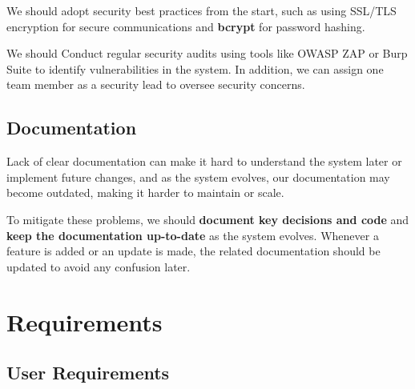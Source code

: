 \documentclass[a4paper,journal]{IEEEtran}
\begin{document}
We should adopt security best practices from the start, such as using SSL/TLS
encryption for secure communications and \textbf{bcrypt} for password hashing.

We should Conduct regular security audits using tools like OWASP ZAP or Burp
Suite to identify vulnerabilities in the system.
In addition, we can assign one team member as a security lead to oversee
security concerns.

\subsection{Documentation}
Lack of clear documentation can make it hard to understand the system later or
implement future changes, and as the system evolves, our documentation may
become outdated, making it harder to maintain or scale.

To mitigate these problems, we should
\textbf{document key decisions and code} and
\textbf{keep the documentation up-to-date} as the system evolves.
Whenever a feature is added or an update is made, the related documentation
should be updated to avoid any confusion later.

\section{Requirements}
\subsection{User Requirements}
\end{document}
